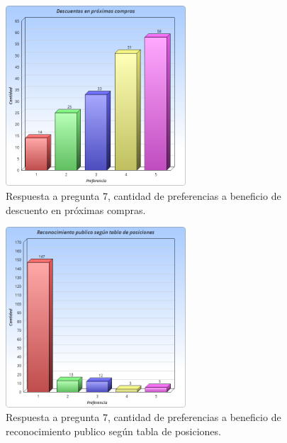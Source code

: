 \begin{figure}[!htb]
  \centering
  \includegraphics[width=0.6\textwidth]{images/Graficos/graf_5_7.png}
  \caption[Gráfico pregunta 7, cantidad de preferencias a beneficio de descuento en
próximas compras.]{Respuesta a pregunta 7, cantidad de preferencias a beneficio de descuento en
próximas compras.}
  \label{fig:chart5.7}
\end{figure}

\begin{figure}[!htb]
  \centering
  \includegraphics[width=0.6\textwidth]{images/Graficos/graf_5_8.png}
  \caption[Gráfico pregunta 7, cantidad de preferencias a beneficio de reconocimiento
publico según tabla de posiciones.]{Respuesta a pregunta 7, cantidad de preferencias a beneficio de reconocimiento
publico según tabla de posiciones.}
  \label{fig:chart5.8}
\end{figure}

